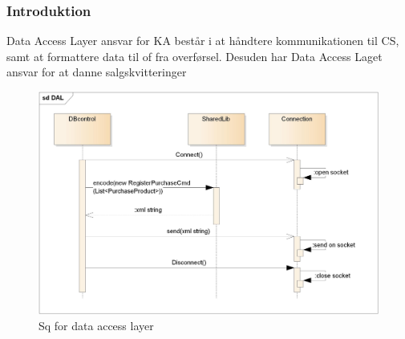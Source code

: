\subsubsection{Introduktion}

Data Access Layer ansvar for \gls{KA} består i at håndtere kommunikationen til \gls{CS}, samt at formattere data til of fra overførsel. Desuden har Data Access Laget ansvar for at danne salgskvitteringer

\begin{figure}[H]
    \centering
    \includegraphics[width=120mm]{Systemdesign/Frontend/DAL/Pics/SQ}
    \caption{Sq for data access layer}
    \label{fig:sqkdal}
\end{figure}

